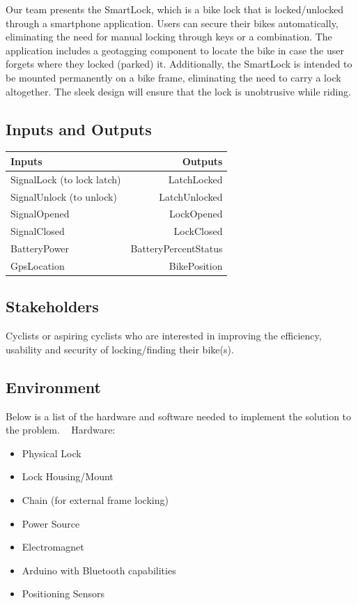 \documentclass{article}
\begin{document}
Our team presents the SmartLock, which is a bike lock that is locked/unlocked through a smartphone application.  Users can secure their bikes automatically, eliminating the need for manual locking through keys or a combination.  The application includes a geotagging component to locate the bike in case the user forgets where they locked (parked) it.  Additionally, the SmartLock is intended to be mounted permanently on a bike frame, eliminating the need to carry a lock altogether.  The sleek design will ensure that the lock is unobtrusive while riding. 


\subsection{Inputs and Outputs}

\begin{table}[hp]
  \begin{center}
    \begin{tabular}{| l | r |}
    \hline
      \textbf{Inputs} & \textbf{Outputs}\\
      \hline
      SignalLock (to lock latch)  & LatchLocked\\
	    SignalUnlock (to unlock) & LatchUnlocked\\
	    SignalOpened & LockOpened\\
	    SignalClosed & LockClosed\\
	    BatteryPower & BatteryPercentStatus\\
	    GpsLocation & BikePosition\\
	    \hline
    \end{tabular}
  \end{center}
\end{table}

\subsection{Stakeholders}

Cyclists or aspiring cyclists who are interested in improving the efficiency, usability and security of locking/finding their bike(s).

\newpage
\subsection{Environment}

Below is a list of the hardware and software needed to implement the solution to the problem.
~\newline
Hardware:
\begin{itemize}
\item Physical Lock
\item Lock Housing/Mount
\item Chain (for external frame locking)
\item Power Source
\item Electromagnet
\item Arduino with Bluetooth capabilities
\item Positioning Sensors
\end{itemize}
\end{document}
